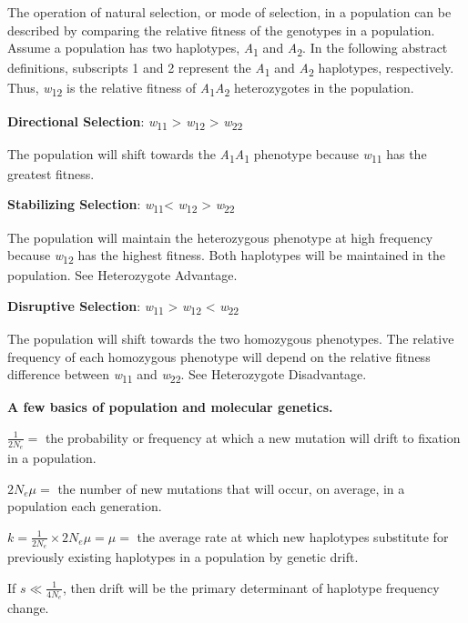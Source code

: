 \documentclass[11pt]{article}
\begin{document}
The operation of natural selection, or mode of selection, in a
population can be described by comparing the relative fitness of the
genotypes in a population. Assume a population has two haplotypes,
\emph{A}\textsubscript{1} and \emph{A}\textsubscript{2}. In the
following abstract definitions, subscripts 1 and 2 represent the
\emph{A}\textsubscript{1} and \emph{A}\textsubscript{2} haplotypes,
respectively. Thus, \emph{w}\textsubscript{12} is the relative fitness
of \emph{A}\textsubscript{1}\emph{A}\textsubscript{2} heterozygotes in
the population.\medskip

\textbf{Directional Selection}: \emph{w}\textsubscript{11}
\textgreater{} \emph{w}\textsubscript{12} \textgreater{}
\emph{w}\textsubscript{22}

\qquad The population will shift towards the
\emph{A}\textsubscript{1}\emph{A}\textsubscript{1} phenotype because
\emph{w}\textsubscript{11} has the greatest fitness.\medskip

\textbf{Stabilizing Selection}: \emph{w}\textsubscript{11}\textless{}
\emph{w}\textsubscript{12} \textgreater{} \emph{w}\textsubscript{22}

\qquad The population will maintain the heterozygous phenotype at high
frequency because \emph{w}\textsubscript{12} has the highest fitness.
Both haplotypes will be maintained in the population. See Heterozygote
Advantage.\medskip

\textbf{Disruptive Selection}: \emph{w}\textsubscript{11} \textgreater{}
\emph{w}\textsubscript{12} \textless{} \emph{w}\textsubscript{22}

\qquad The population will shift towards the two homozygous phenotypes. The
relative frequency of each homozygous phenotype will depend on the
relative fitness difference between \emph{w}\textsubscript{11} and
\emph{w}\textsubscript{22}. See Heterozygote Disadvantage.\medskip

\textbf{A few basics of population and molecular genetics.}

$\frac{1}{2N_e} =$ the probability or frequency at which a new mutation will drift to
fixation in a population.\medskip

$2N_e\mu =$ the number of new mutations that will
occur, on average, in a population each generation.\medskip

$k = \frac{1}{2N_e} \times 2N_e\mu = \mu =$ the average rate at which new haplotypes substitute for previously
existing haplotypes in a population by genetic drift.\medskip

If $s \ll \frac{1}{4N_e}$, then drift will be the primary determinant of haplotype frequency
change.\medskip
\end{document}
